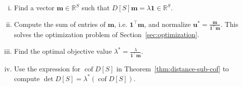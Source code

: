 \documentclass{amsart}
\theoremstyle{definition}
\newcommand{\RR}{\mathbb{R}}
\newcommand{\bone}{\mathbf{1}}
\newcommand{\boldm}{\mathbf{m}}
\newcommand{\boldu}{\mathbf{u}}
\newcommand{\tr}{\intercal}
\DeclareMathOperator{\cof}{cof}
\begin{document}
\begin{enumerate}[(i)]
\item 
Find a vector $\boldm \in \RR^S$ such that $D[S]\boldm = \lambda \mathbf{1} \in \RR^S$.

\item 
Compute the sum of entries of $\boldm$, i.e. $\mathbf{1}^\tr \boldm$, and normalize
$\displaystyle
	\boldu^* = \frac{\boldm}{\bone^\tr \boldm}.
$
This solves the optimization problem of Section~\ref{sec:optimization}.

\item 
Find the optimal objective value
$\displaystyle
	\lambda^* = \frac{\lambda}{\bone^\tr \boldm}.
$


\item
Use the expression for $\cof D[S]$ in Theorem~\ref{thm:distance-sub-cof} to compute $\det D[S] = \lambda^* (\cof D[S])$.
\end{enumerate}
\end{document}
